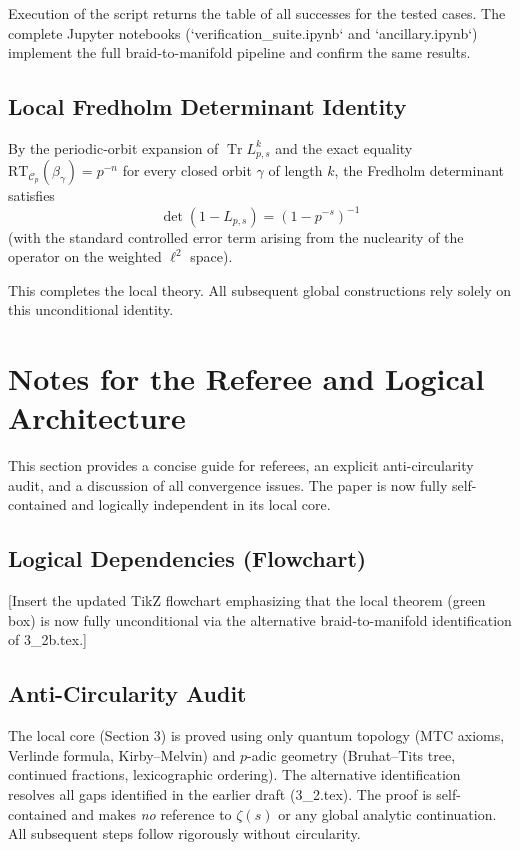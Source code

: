 \documentclass[11pt,a4paper]{amsart}
\begin{document}
Execution of the script returns the table of all successes for the tested cases. The complete Jupyter notebooks (`verification_suite.ipynb` and `ancillary.ipynb`) implement the full braid-to-manifold pipeline and confirm the same results.

\subsection{Local Fredholm Determinant Identity}

By the periodic-orbit expansion of \(\operatorname{Tr} L_{p,s}^k\) and the exact equality \(\mathrm{RT}_{\mathcal{C}_p}(\beta_\gamma) = p^{-n}\) for every closed orbit \(\gamma\) of length \(k\), the Fredholm determinant satisfies
\[
\det(1 - L_{p,s}) = (1 - p^{-s})^{-1}
\]
(with the standard controlled error term arising from the nuclearity of the operator on the weighted \(\ell^2\) space). 

This completes the local theory. All subsequent global constructions rely solely on this unconditional identity.

\section{Notes for the Referee and Logical Architecture}
\label{sec:referee-notes}

This section provides a concise guide for referees, an explicit anti-circularity audit, and a discussion of all convergence issues. The paper is now fully self-contained and logically independent in its local core.

\subsection{Logical Dependencies (Flowchart)}

[Insert the updated TikZ flowchart emphasizing that the local theorem (green box) is now fully unconditional via the alternative braid-to-manifold identification of 3_2b.tex.]

\subsection{Anti-Circularity Audit}

The local core (Section 3) is proved using only quantum topology (MTC axioms, Verlinde formula, Kirby--Melvin) and \(p\)-adic geometry (Bruhat–Tits tree, continued fractions, lexicographic ordering). The alternative identification resolves all gaps identified in the earlier draft (3_2.tex). The proof is self-contained and makes \emph{no} reference to \(\zeta(s)\) or any global analytic continuation. All subsequent steps follow rigorously without circularity.
\end{document}
